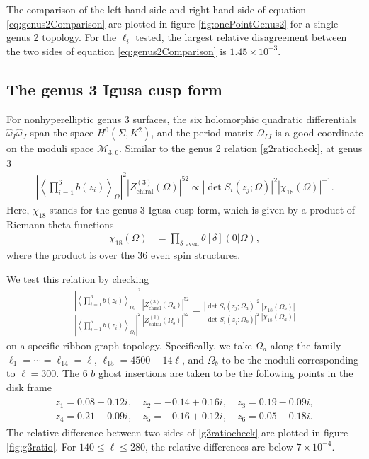 \documentclass[12pt]{article}
\def\ie{\begin{equation}\begin{aligned}}
\def\fe{\end{aligned}\end{equation}}
\numberwithin{equation}{section}
\begin{document}
The comparison of the left hand side and right hand side of equation \eqref{eq:genus2Comparison} are plotted in figure \ref{fig:onePointGenus2} for a single genus 2 topology. For the $\ell_i$ tested, the largest relative disagreement between the two sides of equation \eqref{eq:genus2Comparison} is $1.45\times 10^{-3}$.

\subsection{The genus 3 Igusa cusp form}

For nonhyperelliptic genus 3 surfaces, the six holomorphic quadratic differentials $\hat{\omega}_I \hat{\omega}_J$ span the space $H^0(\Sigma, K^2)$, and the period matrix $\Omega_{IJ}$ is a good coordinate on the moduli space $\mathcal{M}_{3,0}$. Similar to the genus 2 relation \eqref{g2ratiocheck}, at genus 3
\ie \label{corrgenus3}
\left|\left\langle \prod_{i=1}^6 b(z_i) \right\rangle_\Omega \right|^2|Z_\text{chiral}^{(3)}(\Omega)|^{52} \propto |\det S_i(z_j;\Omega)|^2 |\chi_{18}(\Omega)|^{-1}.
\fe
Here, $\chi_{18}$ stands for the genus 3 Igusa cusp form, which is given by a product of Riemann theta functions \cite{Igusa:1967}
\ie
\chi_{18}(\Omega)&=\prod_{\delta \text{ even}}\theta[\delta](0|\Omega),
\fe
where the product is over the 36 even spin structures. 

We test this relation by checking
\ie \label{g3ratiocheck}
\frac{\left|\left\langle \prod_{i=1}^6 b(z_i)\right\rangle_{\Omega_a}\right|^2}{\left|\left\langle \prod_{i=1}^6 b(z_i)\right\rangle_{\Omega_b}\right|^2}\frac{\left|Z_{\text {chiral}}^{(3)}\left(\Omega_a\right)\right|^{52}}{\left|Z_{\text {chiral}}^{(3)}\left(\Omega_b\right)\right|^{52}} =\frac{\left|\operatorname{det} S_i\left(z_j ; \Omega_a\right)\right|^2}{\left|\operatorname{det} S_i\left(z_j ; \Omega_b\right)\right|^2} \frac{\left|\chi_{18}\left(\Omega_b\right)\right|}{\left|\chi_{18}\left(\Omega_a\right)\right|} 
\fe
on a specific ribbon graph topology. %
Specifically, we take $\Omega_a$ along the family $\ell_1=\cdots =\ell_{14}=\ell$, $\ell_{15}=4500-14\ell$, and $\Omega_b$ to be the moduli corresponding to $\ell = 300$. The 6 $b$ ghost insertions are taken to be the following points in the disk frame 
\ie\begin{gathered}
    z_1 = 0.08+0.12i,\quad z_2 = -0.14+0.16i,\quad z_3=0.19-0.09i,\\
    z_4=0.21+0.09i,\quad z_5=-0.16+0.12i,\quad z_6 = 0.05-0.18i.
\end{gathered}
\fe
The relative difference between two sides of \eqref{g3ratiocheck} are plotted in figure \ref{fig:g3ratio}. For $140\leq \ell \leq 280$, the relative differences are below $7\times 10^{-4}$.
\end{document}
